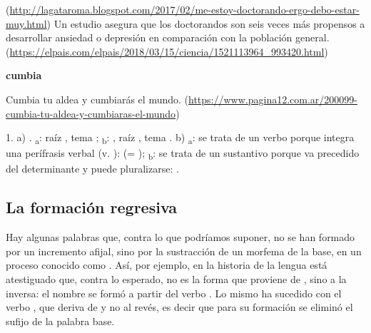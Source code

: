 \begin{ejercicio}
\begin{exe}
\begin{xlist}
          (\url{http://lagataroma.blogspot.com/2017/02/me-estoy-doctorando-ergo-debo-estar-muy.html})
      \ex Un estudio asegura que los doctorandos son seis veces más propensos a
          desarrollar ansiedad o depresión en comparación con la población
          general.
          (\url{https://elpais.com/elpais/2018/03/15/ciencia/1521113964_993420.html})
    \end{xlist}
  \ex \textbf{cumbia}
    \begin{xlist}
      \ex {}
      \ex Cumbia tu aldea y cumbiarás el mundo.
          (\url{https://www.pagina12.com.ar/200099-cumbia-tu-aldea-y-cumbiaras-el-mundo})
    \end{xlist}
\end{exe}

\begin{resuelto}
1. a) . \textsubscript{a}: raíz ,
tema ; \textsubscript{b}: , raíz
, tema . b) \textsubscript{a}: se
trata de un verbo porque integra una perífrasis verbal (v. ):
 (= );
\textsubscript{b}: se trata de un sustantivo porque va precedido
del determinante  y puede pluralizarse: .
\end{resuelto}
\end{ejercicio}

\subsection{La formación regresiva}\label{sec:04-regresiva}

Hay algunas palabras que, contra lo que podríamos suponer, no se han formado por
un incremento afijal, sino por la sustracción de un morfema de la base, en un
proceso conocido como . Así, por ejemplo, en la
historia de la lengua está atestiguado que, contra lo esperado, no es
 la forma que proviene de , sino a la inversa: el
nombre  se formó a partir del verbo . Lo mismo ha
sucedido con el verbo , que deriva de  y no al
revés, es decir que para su formación se eliminó el sufijo  de la
palabra base.

